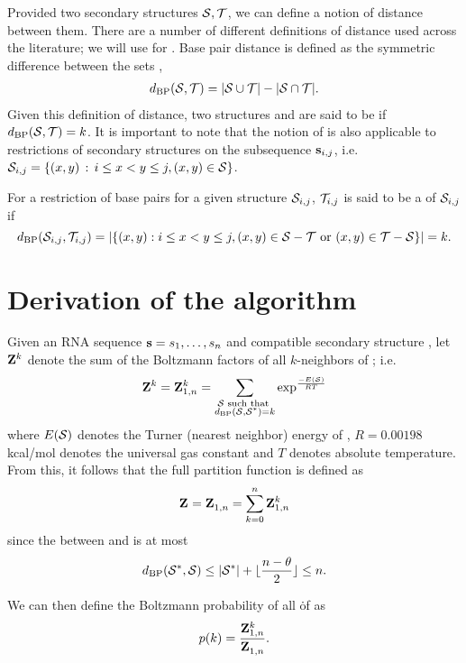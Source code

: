 Provided two secondary structures $\mathcal S,\mathcal T$, we can define a notion of
distance between them. There are a number of different definitions of distance
used across the literature; we will use {\em \bpd} for \fftbor.
Base pair distance is defined as the symmetric difference between the sets
\str,\strT
\begin{align}
\label{eq:fftbor:dBP}
\dBP{\str,\strT} = |\str \cup \strT| - |\str \cap \strT|.
\end{align}
Given this definition of distance, two structures \str and \strT are said to
be \kNbrs if $d_{\text{BP}}(\mathcal S,\mathcal T) = k$. It is important to note that
the notion of \bpd is also applicable to restrictions of secondary structures
on the subsequence ${\bf s}_{i,j}$,
i.e. $\mathcal S_{i,j} = \{ (x,y) \,:\, i \leq  x < y \leq j,  (x,y) \in \mathcal S \}$.

For a restriction of base pairs for a given structure $\mathcal S_{i,j}$,
$\mathcal T_{i,j}$ is said to be a \kNbr of $\mathcal S_{i,j}$ if
\[
d_{\text{BP}}(\mathcal S_{i,j},\mathcal T_{i,j}) = |\{ (x,y): i \leq x<y\leq j,
(x,y) \in \mathcal S - \mathcal T \mbox{ or } (x,y) \in \mathcal T - \mathcal S \}| = k.
\]

\section{Derivation of the \fftbor algorithm}
\label{sec:fftbor:math}

Given an RNA sequence ${\bf s}=s_1,\ldots,s_n$ and compatible secondary structure
\strSt, let ${\bf Z}^{k}_{}$ denote the sum of the Boltzmann factors
\boltzf{\str} of all $k$-neighbors \str of \strSt; i.e.
\[
{\bf Z}^{k}_{} = {\bf Z}^{k}_{1,n} =
\sum_{\substack{\mathcal S \text{ such that }\\ d_{\text{BP}}(\mathcal S,\mathcal S^*)=k}}
\exp^{\frac{-E(\mathcal S)}{RT}}
\]
where $E(\mathcal S)$ denotes the Turner (nearest neighbor)
energy \cite{}
of \str, $R = 0.00198$ kcal/mol denotes the universal
gas constant and $T$ denotes absolute temperature. From this, it follows that
the full partition function is defined as
\begin{align}
\label{eq:fftbor:partFunc}
\bfZ{}{} = \bfZ{}{1,n} = \sum_{k=0}^n \bfZ{k}{1,n}
\end{align}
since the \bpd between \strSt and \str is at most
\begin{align}
\label{eq:fftbor:maxDist}
\dBP{\strSt,\str} \leq |\strSt| + \lfloor \frac{n-\theta}{2} \rfloor \leq n.
\end{align}

We can then define the Boltzmann probability of all \kNbrs \. of \strSt as
\begin{align}
\label{eq:fftbor:probK}
p(k) =\frac{\bfZ{k}{1,n}}{\bfZ{}{1,n}}.
\end{align}

